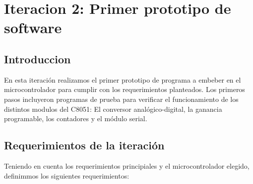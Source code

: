 \chapter{Iteracion 2: Primer prototipo de software} %
\label{cha:iteracion_2}

\section{Introduccion} %
\label{it2:sec:introduccion}


En esta iteración realizamos el primer prototipo de programa a embeber en el microcontrolador para cumplir con los requerimientos planteados. Los primeros pasos incluyeron programas de prueba para verificar el funcionamiento de los distintos modulos del C8051: El conversor analógico-digital, la ganancia programable, los contadores y el módulo serial. 


\section{Requerimientos de la iteración} %
\label{it2:sec:requerimientos_de_la_iteracion}

Teniendo en cuenta los requerimientos principiales y el microcontrolador elegido, definimmos los siguientes requerimientos:

